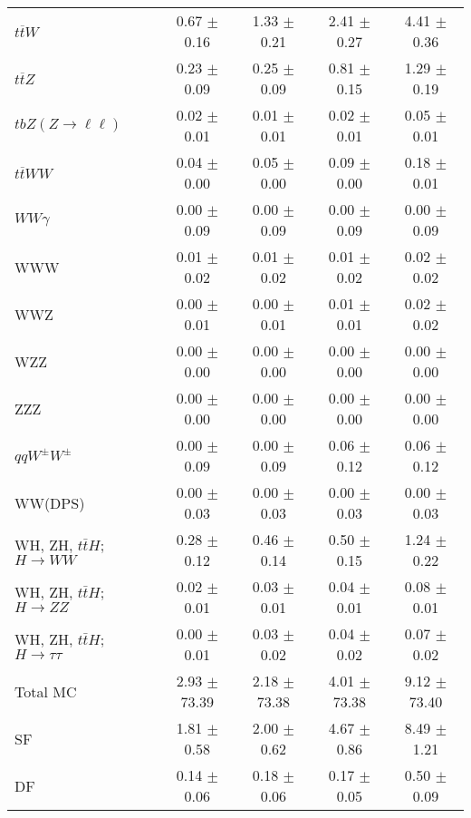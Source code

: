 \begin{tabular}{l|cccc}
                   $t\overline{t}W$ &  0.67 $\pm$  0.16 &  1.33 $\pm$  0.21 &  2.41 $\pm$  0.27 &  4.41 $\pm$  0.36 \\
                   $t\overline{t}Z$ &  0.23 $\pm$  0.09 &  0.25 $\pm$  0.09 &  0.81 $\pm$  0.15 &  1.29 $\pm$  0.19 \\
    $tbZ (Z \rightarrow \ell \ell)$ &  0.02 $\pm$  0.01 &  0.01 $\pm$  0.01 &  0.02 $\pm$  0.01 &  0.05 $\pm$  0.01 \\
                  $t\overline{t}WW$ &  0.04 $\pm$  0.00 &  0.05 $\pm$  0.00 &  0.09 $\pm$  0.00 &  0.18 $\pm$  0.01 \\
                         $WW\gamma$ &  0.00 $\pm$  0.09 &  0.00 $\pm$  0.09 &  0.00 $\pm$  0.09 &  0.00 $\pm$  0.09 \\
                                WWW &  0.01 $\pm$  0.02 &  0.01 $\pm$  0.02 &  0.01 $\pm$  0.02 &  0.02 $\pm$  0.02 \\
                                WWZ &  0.00 $\pm$  0.01 &  0.00 $\pm$  0.01 &  0.01 $\pm$  0.01 &  0.02 $\pm$  0.02 \\
                                WZZ &  0.00 $\pm$  0.00 &  0.00 $\pm$  0.00 &  0.00 $\pm$  0.00 &  0.00 $\pm$  0.00 \\
                                ZZZ &  0.00 $\pm$  0.00 &  0.00 $\pm$  0.00 &  0.00 $\pm$  0.00 &  0.00 $\pm$  0.00 \\
                 $qqW^{\pm}W^{\pm}$ &  0.00 $\pm$  0.09 &  0.00 $\pm$  0.09 &  0.06 $\pm$  0.12 &  0.06 $\pm$  0.12 \\
                            WW(DPS) &  0.00 $\pm$  0.03 &  0.00 $\pm$  0.03 &  0.00 $\pm$  0.03 &  0.00 $\pm$  0.03 \\
WH, ZH, $t\bar{t}H$; $H \rightarrow WW$ &  0.28 $\pm$  0.12 &  0.46 $\pm$  0.14 &  0.50 $\pm$  0.15 &  1.24 $\pm$  0.22 \\
WH, ZH, $t\bar{t}H$; $H \rightarrow ZZ$ &  0.02 $\pm$  0.01 &  0.03 $\pm$  0.01 &  0.04 $\pm$  0.01 &  0.08 $\pm$  0.01 \\
WH, ZH, $t\bar{t}H$; $H \rightarrow \tau\tau$ &  0.00 $\pm$  0.01 &  0.03 $\pm$  0.02 &  0.04 $\pm$  0.02 &  0.07 $\pm$  0.02 \\
\hline\hline
                           Total MC &  2.93 $\pm$ 73.39 &  2.18 $\pm$ 73.38 &  4.01 $\pm$ 73.38 &  9.12 $\pm$ 73.40 \\
\hline
                                 SF &  1.81 $\pm$  0.58 &  2.00 $\pm$  0.62 &  4.67 $\pm$  0.86 &  8.49 $\pm$  1.21 \\
                                 DF &  0.14 $\pm$  0.06 &  0.18 $\pm$  0.06 &  0.17 $\pm$  0.05 &  0.50 $\pm$  0.09 \\

\end{tabular}
